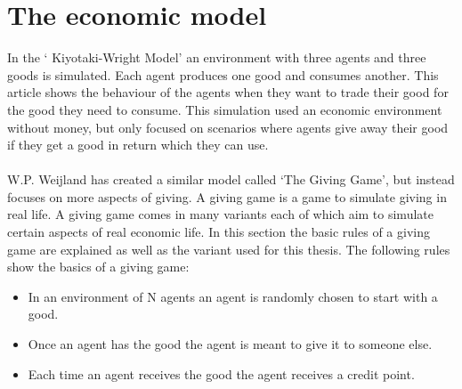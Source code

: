 \documentclass[twoside,openright]{uva-bachelor-thesis}
\begin{document}
\section{The economic model}
In the ‘ Kiyotaki-Wright Model’\cite{moranmoney} an environment with three agents and three goods is simulated. Each agent produces one good and consumes another. This article shows the behaviour of the agents when they want to trade their good for the good they need to consume. This simulation used an economic environment without money, but only focused on scenarios where agents give away their good if they get a good in return which they can use. 
\\
\\
W.P. Weijland has created a similar model called ‘The Giving Game’, but instead focuses on more aspects of giving. A giving game is a game to simulate giving in real life. A giving game comes in many variants each of which aim to simulate certain aspects of real economic life. In this section the basic rules of a giving game are explained as well as the variant used for this thesis.
The following rules show the basics of a giving game:
\begin{itemize}
\item In an environment of N agents an agent is randomly chosen to start with a good.
\item Once an agent has the good the agent is meant to give it to someone else.
\item Each time an agent receives the good the agent receives a credit point.
\end{itemize}
\end{document}
